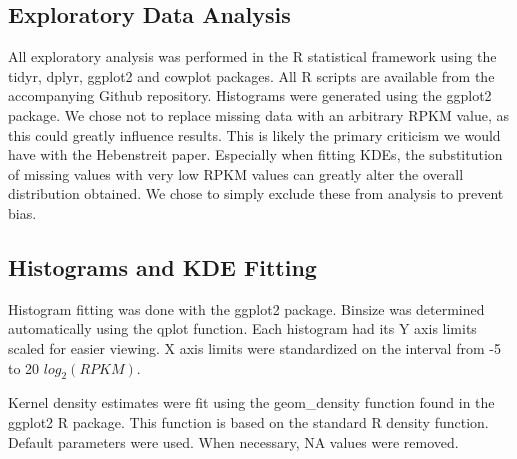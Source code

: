 \documentclass[12pt]{report}
\begin{document}

\subsection*{Exploratory Data Analysis}
All exploratory analysis was performed in the R statistical framework using the tidyr, dplyr, ggplot2 and cowplot packages.
All R scripts are available from the accompanying Github repository. Histograms were generated using the ggplot2
package. We chose not to replace missing data with an arbitrary RPKM value, as this could greatly influence results. This is likely the primary criticism we
would have with the Hebenstreit paper. Especially when fitting KDEs, the substitution of missing values with very low RPKM values can greatly
alter the overall distribution obtained. We chose to simply exclude these from analysis to prevent bias.


\subsection*{Histograms and KDE Fitting}
Histogram fitting was done with the ggplot2 package. Binsize was determined automatically using the qplot function. Each histogram had its Y axis limits scaled for easier viewing.
X axis limits were standardized on the interval from -5 to 20 $log_{2}(RPKM)$.


Kernel density estimates were fit using the geom\_density function found in the ggplot2 R package. This function is based on the standard R density function.
Default parameters were used. When necessary, NA values were removed.
\end{document}
